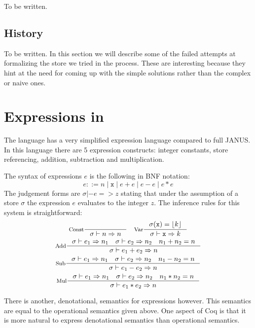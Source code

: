 
To be written.



\subsection{History}

To be written. In this section we will describe some of the failed
attempts at formalizing the store we tried in the process. These are
interesting because they hint at the need for coming up with the
simple solutions rather than the complex or naive ones.

\section{Expressions in \janusz{}}

The \janusz{} language has a very simplified expression language
compared to full JANUS. In this language there are 5 expression
constructs: integer constants, store referencing, addition,
subtraction and multiplication.

The syntax of expressions $e$ is the following in BNF notation:
\newcommand{\bor}{\; | \;}
\begin{equation*}
  e ::= n \bor \mathtt{x} \bor e + e \bor e - e \bor e * e
\end{equation*}
The judgement forms are $\sigma |- e => z$ stating that under the
assumption of a store $\sigma$ the expression $e$ evaluates to the
integer $z$. The inference rules for this system is straightforward:
\begin{gather*}
  \inference[Const]{}{\sigma |- n => n} \quad \inference[Var]{\sigma(\mathtt{x}) =
    \lift{k}}{\sigma |- \mathtt{x} => k} \\
  \inference[Add]{\sigma |- e_1 => n_1 \quad \sigma |- e_2 => n_2 \quad
    n_1 + n_2 = n}{\sigma |- e_1 + e_2 => n} \\
  \inference[Sub]{\sigma |- e_1 => n_1 \quad \sigma |- e_2 => n_2 \quad
    n_1 - n_2 = n}{\sigma |- e_1 - e_2 => n} \\
  \inference[Mul]{\sigma |- e_1 => n_1 \quad \sigma |- e_2 => n_2 \quad
    n_1 * n_2 = n}{\sigma |- e_1 * e_2 => n}
\end{gather*}

There is another, denotational, semantics for expressions
however. This semantics are equal to the operational semantics given
above. One aspect of Coq is that it is more natural to express
denotational semantics than operational semantics.

